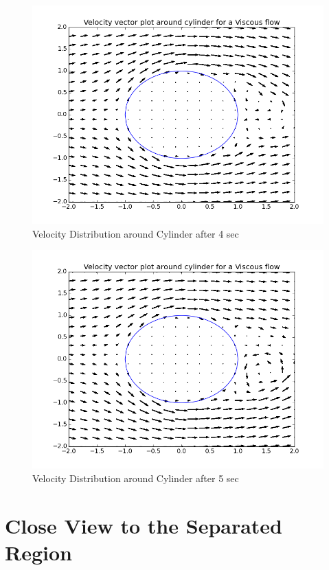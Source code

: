 \documentclass{article}
\begin{document}
\begin{figure}[H] \label{figure}
\includegraphics[width=12cm]{streamlines_four.png}
\caption{Velocity Distribution around Cylinder after 4 sec}
\label{figure:}
\end{figure} 

\begin{figure}[H] \label{figure}
\includegraphics[width=12cm]{streamlines_five.png}
\caption{Velocity Distribution around Cylinder after 5 sec}
\label{figure:}
\end{figure}
\newpage

\section{Close View to the Separated Region}
\end{document}

